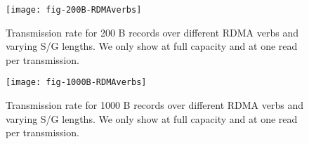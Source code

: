 \begin{figure}[H]
\texttt{[image: fig-200B-RDMAverbs]}
\caption{Transmission rate for 200 B records over different RDMA verbs and 
varying S/G lengths. We only show  at full capacity and  at one read per transmission.}
\label{fig:200B_transrate}
\texttt{[image: fig-1000B-RDMAverbs]}
\caption{Transmission rate for 1000 B records over different RDMA verbs and 
varying S/G lengths. We only show  at full capacity and  at one read per transmission.}
\label{fig:1000B_transrate}
\end{figure}
